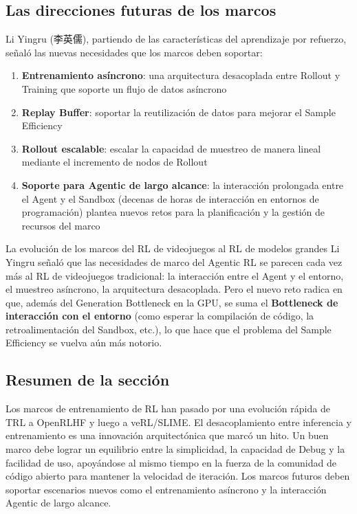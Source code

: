 \documentclass[a4paper]{article}
\begin{document}
\subsection{Las direcciones futuras de los marcos}

Li Yingru (李英儒), partiendo de las características del aprendizaje por refuerzo, señaló las nuevas necesidades que los marcos deben soportar:

\begin{enumerate}
    \item \textbf{Entrenamiento asíncrono}: una arquitectura desacoplada entre Rollout y Training que soporte un flujo de datos asíncrono
    \item \textbf{Replay Buffer}: soportar la reutilización de datos para mejorar el Sample Efficiency
    \item \textbf{Rollout escalable}: escalar la capacidad de muestreo de manera lineal mediante el incremento de nodos de Rollout
    \item \textbf{Soporte para Agentic de largo alcance}: la interacción prolongada entre el Agent y el Sandbox (decenas de horas de interacción en entornos de programación) plantea nuevos retos para la planificación y la gestión de recursos del marco
\end{enumerate}

\begin{knowledgebox}{La evolución de los marcos del RL de videojuegos al RL de modelos grandes}
Li Yingru señaló que las necesidades de marco del Agentic RL se parecen cada vez más al RL de videojuegos tradicional: la interacción entre el Agent y el entorno, el muestreo asíncrono, la arquitectura desacoplada. Pero el nuevo reto radica en que, además del Generation Bottleneck en la GPU, se suma el \textbf{Bottleneck de interacción con el entorno} (como esperar la compilación de código, la retroalimentación del Sandbox, etc.), lo que hace que el problema del Sample Efficiency se vuelva aún más notorio.
\end{knowledgebox}

\subsection{Resumen de la sección}

Los marcos de entrenamiento de RL han pasado por una evolución rápida de TRL a OpenRLHF y luego a veRL/SLIME. El desacoplamiento entre inferencia y entrenamiento es una innovación arquitectónica que marcó un hito. Un buen marco debe lograr un equilibrio entre la simplicidad, la capacidad de Debug y la facilidad de uso, apoyándose al mismo tiempo en la fuerza de la comunidad de código abierto para mantener la velocidad de iteración. Los marcos futuros deben soportar escenarios nuevos como el entrenamiento asíncrono y la interacción Agentic de largo alcance.
\end{document}
